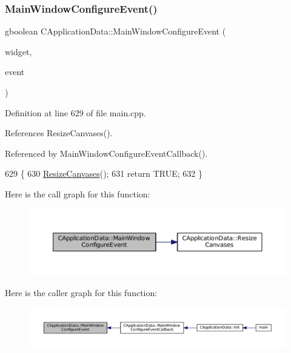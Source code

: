 \subsubsection{\texorpdfstring{Main\+Window\+Configure\+Event()}{MainWindowConfigureEvent()}}
{\footnotesize\ttfamily gboolean C\+Application\+Data\+::\+Main\+Window\+Configure\+Event (\begin{DoxyParamCaption}\item[{Gtk\+Widget $\ast$}]{widget,  }\item[{Gdk\+Event $\ast$}]{event }\end{DoxyParamCaption})\hspace{0.3cm}{\ttfamily [protected]}}



Definition at line 629 of file main.\+cpp.



References Resize\+Canvases().



Referenced by Main\+Window\+Configure\+Event\+Callback().


\begin{DoxyCode}
629                                                                                      \{
630     \hyperlink{classCApplicationData_ad8b16ccb099b4996ce9fee34a407c091}{ResizeCanvases}();
631     \textcolor{keywordflow}{return} TRUE;
632 \}
\end{DoxyCode}
Here is the call graph for this function\+:\nopagebreak
\begin{figure}[H]
\begin{center}
\leavevmode
\includegraphics[width=350pt]{classCApplicationData_a7abef8a548d0ad3adb70f11d8a74176c_cgraph}
\end{center}
\end{figure}
Here is the caller graph for this function\+:\nopagebreak
\begin{figure}[H]
\begin{center}
\leavevmode
\includegraphics[width=350pt]{classCApplicationData_a7abef8a548d0ad3adb70f11d8a74176c_icgraph}
\end{center}
\end{figure}
\hypertarget{classCApplicationData_a31b48405b43d73cabca4c080c1b9beee}{}\label{classCApplicationData_a31b48405b43d73cabca4c080c1b9beee} 

